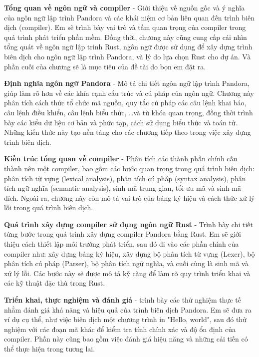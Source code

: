 \begin{mucluc}
    
    \item {\bf{Tổng quan về ngôn ngữ và compiler}} - 
        Giới thiệu về nguồn gốc và ý nghĩa của ngôn ngữ lập trình Pandora và các khái niệm cơ bản liên quan đến trình biên dịch (compiler). Em sẽ trình bày vai trò và tầm quan trọng của compiler trong quá trình phát triển phần mềm. Đồng thời, chương này cũng cung cấp cái nhìn tổng quát về ngôn ngữ lập trình Rust, ngôn ngữ được sử dụng để xây dựng trình biên dịch cho ngôn ngữ lập trình Pandora, và lý do lựa chọn Rust cho dự án. Và phần cuối của chương sẽ là mục tiêu của đề tài do bọn em đặt ra.
    \item {\bf{Định nghĩa ngôn ngữ Pandora}} - 
        Mô tả chi tiết ngôn ngữ lập trình Pandora, giúp làm rõ hơn về các khía cạnh cấu trúc và cú pháp của ngôn ngữ. Chương này phân tích cách thức tổ chức mã nguồn, quy tắc cú pháp các câu lệnh khai báo, câu lệnh điều khiển, câu lệnh biểu thức, \dots và từ khóa quan trọng, đồng thời trình bày các kiểu dữ liệu cơ bản và phức tạp, cách sử dụng biểu thức và toán tử. Những kiến thức này tạo nền tảng cho các chương tiếp theo trong việc xây dựng trình biên dịch.
    \item {\bf{Kiến trúc tổng quan về compiler}} - 
        Phân tích các thành phần chính cấu thành nên một compiler, 
        bao gồm các bước quan trọng trong quá trình biên dịch: phân tích 
        từ vựng (lexical analysis), phân tích cú pháp (syntax analysis), 
        phân tích ngữ nghĩa (semantic analysis), sinh mã trung gian, 
        tối ưu mã và sinh mã đích. Ngoài ra, chương này còn mô tả vai 
        trò của bảng ký hiệu và cách thức xử lý lỗi trong quá trình biên 
        dịch.
    \item {\bf{Quá trình xây dựng compiler sử dụng ngôn ngữ Rust}} - 
        Trình bày chi tiết từng bước trong quá trình xây dựng compiler 
        Pandora bằng Rust. Em sẽ giới thiệu cách thiết lập môi trường 
        phát triển, sau đó đi vào các phần chính của compiler như: 
        xây dựng bảng ký hiệu, xây dựng bộ phân tích từ vựng (Lexer), 
        bộ phân tích cú pháp (Parser), bộ phân tích ngữ nghĩa, và cuối 
        cùng là sinh mã và xử lý lỗi. Các bước này sẽ được mô tả kỹ càng 
        để làm rõ quy trình triển khai và các kỹ thuật đặc thù trong Rust.
    \item {\bf{Triển khai, thực nghiệm và đánh giá}} - 
        trình bày các thử nghiệm thực tế nhằm đánh giá khả năng và hiệu quả 
        của trình biên dịch Pandora. Em sẽ đưa ra ví dụ cụ thể, như việc 
        biên dịch một chương trình in "Hello, world", sau đó thử nghiệm 
        với các đoạn mã khác để kiểm tra tính chính xác và độ ổn định của 
        compiler. Phần này cũng bao gồm việc đánh giá hiệu năng và những 
        cải tiến có thể thực hiện trong tương lai.
\end{mucluc}

